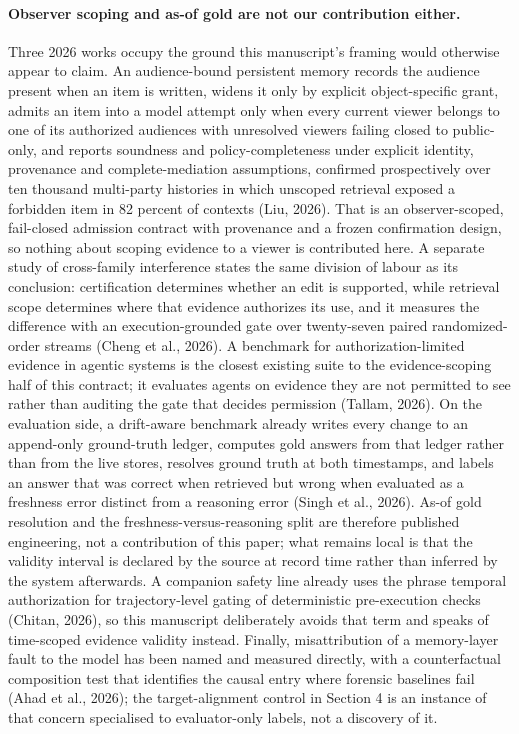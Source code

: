 \documentclass[11pt]{article}
\begin{document}
\paragraph{Observer scoping and as-of gold are not our contribution either.} Three 2026 works occupy the ground this manuscript's framing would otherwise appear to claim. An audience-bound persistent memory records the audience present when an item is written, widens it only by explicit object-specific grant, admits an item into a model attempt only when every current viewer belongs to one of its authorized audiences with unresolved viewers failing closed to public-only, and reports soundness and policy-completeness under explicit identity, provenance and complete-mediation assumptions, confirmed prospectively over ten thousand multi-party histories in which unscoped retrieval exposed a forbidden item in 82 percent of contexts (Liu, 2026). That is an observer-scoped, fail-closed admission contract with provenance and a frozen confirmation design, so nothing about scoping evidence to a viewer is contributed here. A separate study of cross-family interference states the same division of labour as its conclusion: certification determines whether an edit is supported, while retrieval scope determines where that evidence authorizes its use, and it measures the difference with an execution-grounded gate over twenty-seven paired randomized-order streams (Cheng et al., 2026). A benchmark for authorization-limited evidence in agentic systems is the closest existing suite to the evidence-scoping half of this contract; it evaluates agents on evidence they are not permitted to see rather than auditing the gate that decides permission (Tallam, 2026). On the evaluation side, a drift-aware benchmark already writes every change to an append-only ground-truth ledger, computes gold answers from that ledger rather than from the live stores, resolves ground truth at both timestamps, and labels an answer that was correct when retrieved but wrong when evaluated as a freshness error distinct from a reasoning error (Singh et al., 2026). As-of gold resolution and the freshness-versus-reasoning split are therefore published engineering, not a contribution of this paper; what remains local is that the validity interval is declared by the source at record time rather than inferred by the system afterwards. A companion safety line already uses the phrase temporal authorization for trajectory-level gating of deterministic pre-execution checks (Chitan, 2026), so this manuscript deliberately avoids that term and speaks of time-scoped evidence validity instead. Finally, misattribution of a memory-layer fault to the model has been named and measured directly, with a counterfactual composition test that identifies the causal entry where forensic baselines fail (Ahad et al., 2026); the target-alignment control in Section 4 is an instance of that concern specialised to evaluator-only labels, not a discovery of it.
\end{document}
